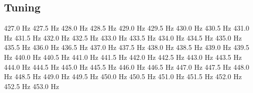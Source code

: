 \subsection{Tuning}















427.0 Hz
427.5 Hz
428.0 Hz
428.5 Hz
429.0 Hz
429.5 Hz
430.0 Hz
430.5 Hz
431.0 Hz
431.5 Hz
432.0 Hz
432.5 Hz
433.0 Hz
433.5 Hz
434.0 Hz
434.5 Hz
435.0 Hz
435.5 Hz
436.0 Hz
436.5 Hz
437.0 Hz
437.5 Hz
438.0 Hz
438.5 Hz
439.0 Hz
439.5 Hz
440.0 Hz
440.5 Hz
441.0 Hz
441.5 Hz
442.0 Hz
442.5 Hz
443.0 Hz
443.5 Hz
444.0 Hz
444.5 Hz
445.0 Hz
445.5 Hz
446.0 Hz
446.5 Hz
447.0 Hz
447.5 Hz
448.0 Hz
448.5 Hz
449.0 Hz
449.5 Hz
450.0 Hz
450.5 Hz
451.0 Hz
451.5 Hz
452.0 Hz
452.5 Hz
453.0 Hz
